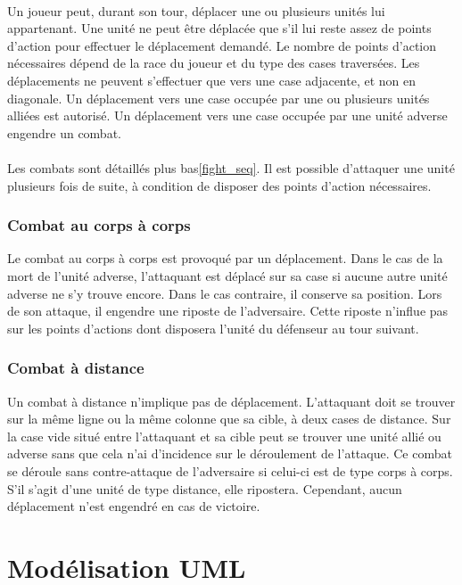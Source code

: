 \documentclass[a4paper]{article}
\begin{document}
\paragraph{}
Un joueur peut, durant son tour, déplacer une ou plusieurs unités lui appartenant. Une unité ne peut être déplacée que s'il lui reste assez de points d'action pour effectuer le déplacement demandé. Le nombre de points d'action nécessaires dépend de la race du joueur et du type des cases traversées. Les déplacements ne peuvent s'effectuer que vers une case adjacente, et non en diagonale. Un déplacement vers une case occupée par une ou plusieurs unités alliées est autorisé. Un déplacement vers une case occupée par une unité adverse engendre un combat.

\paragraph{}
Les combats sont détaillés plus bas\ref{fight_seq}. Il est possible d'attaquer une unité plusieurs fois de suite, à condition de disposer des points d'action nécessaires.

\subsubsection{Combat au corps à corps}
Le combat au corps à corps est provoqué par un déplacement. Dans le cas de la mort de l'unité adverse, l'attaquant est déplacé sur sa case si aucune autre unité adverse ne s'y trouve encore. Dans le cas contraire, il conserve sa position.
Lors de son attaque, il engendre une riposte de l'adversaire. Cette riposte n'influe pas sur les points d'actions dont disposera l'unité du défenseur au tour suivant.
\subsubsection{Combat à distance}
Un combat à distance n'implique pas de déplacement. L'attaquant doit se trouver sur la même ligne ou la même colonne que sa cible, à deux cases de distance. Sur la case vide situé entre l'attaquant et sa cible peut se trouver une unité allié ou adverse sans que cela n'ai d'incidence sur le déroulement de l'attaque.
Ce combat se déroule sans contre-attaque de l'adversaire si celui-ci est de type corps à corps. S'il s'agit d'une unité de type distance, elle ripostera. Cependant, aucun déplacement n'est engendré en cas de victoire.
\section{Modélisation UML}
\end{document}
